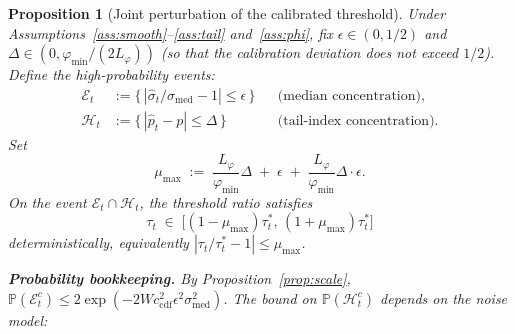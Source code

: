 \documentclass[11pt]{article}
\newtheorem{proposition}[theorem]{Proposition}
\theoremstyle{definition}
\newcommand{\Prob}{\mathbb{P}}
\newcommand{\abs}[1]{\left| #1 \right|}
\newcommand{\phat}{\hat{p}}
\newcommand{\shat}{\hat{\sigma}}
\begin{document}
\begin{proposition}[Joint perturbation of the calibrated threshold]
\label{prop:joint_perturb}
Under Assumptions~\ref{ass:smooth}--\ref{ass:tail} and~\ref{ass:phi},
fix $\epsilon \in (0, 1/2)$ and $\Delta \in (0, \varphi_{\min}/(2 L_\varphi))$
\textup{(}so that the calibration deviation does not exceed $1/2$\textup{)}.
Define the high-probability events:
\begin{align*}
  \mathcal{E}_t &:= \bigl\{\,\abs{\shat_t/\sigma_{\mathrm{med}} - 1} \leq \epsilon\,\bigr\}
    && \text{(median concentration)}, \\
  \mathcal{H}_t &:= \bigl\{\,\abs{\phat_t - p} \leq \Delta\,\bigr\}
    && \text{(tail-index concentration)}.
\end{align*}
Set
\begin{equation}\label{eq:mu_max}
  \mu_{\max}
  \;:=\; \frac{L_\varphi}{\varphi_{\min}}\Delta \;+\; \epsilon \;+\;
    \frac{L_\varphi}{\varphi_{\min}}\Delta\cdot\epsilon.
\end{equation}
On the event $\mathcal{E}_t \cap \mathcal{H}_t$, the threshold ratio satisfies
\begin{equation}\label{eq:tau_envelope}
  \tau_t \;\in\; \bigl[(1-\mu_{\max})\tau_t^{*},\, (1+\mu_{\max})\tau_t^{*}\bigr]
\end{equation}
deterministically, equivalently $\abs{\tau_t/\tau_t^{*} - 1} \leq \mu_{\max}$.

\medskip
\textbf{Probability bookkeeping.}
By Proposition~\ref{prop:scale},
$\Prob(\mathcal{E}_t^{c}) \leq 2\exp\!\left(-2W c_{\mathrm{cdf}}^2 \epsilon^2 \sigma_{\mathrm{med}}^2\right)$.
The bound on $\Prob(\mathcal H_t^c)$ depends on the noise model:


\end{proposition}
\end{document}
